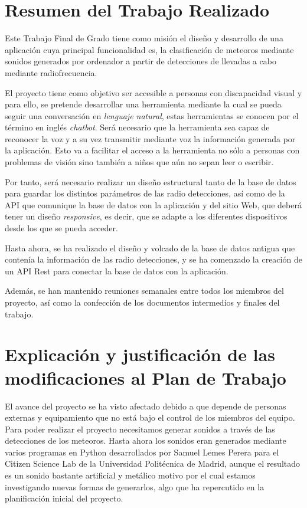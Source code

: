 \chapter{Resumen del Trabajo Realizado}
Este Trabajo Final de Grado tiene como misión el diseño y desarrollo de una aplicación cuya principal funcionalidad es, la clasificación de  meteoros mediante sonidos generados por ordenador a partir de detecciones de llevadas a cabo mediante radiofrecuencia. 

El proyecto tiene como objetivo ser accesible a personas con discapacidad visual y para ello, se pretende desarrollar una herramienta mediante la cual se pueda seguir una conversación en \textit{lenguaje natural}, estas herramientas se conocen por el término en inglés \textit{chatbot}. Será necesario que la herramienta sea capaz de reconocer la voz y a su vez transmitir mediante voz la información generada por la aplicación.
Esto va a facilitar el acceso a la herramienta no sólo a personas con problemas de visión sino también a niños que aún no sepan leer o escribir.

Por tanto, será necesario realizar un diseño estructural tanto de la base de datos para guardar los distintos parámetros de las radio detecciones, así como de la API que comunique la base de datos con la aplicación y del sitio Web, que deberá tener un diseño \textit{responsive}, es decir, que se adapte a los diferentes dispositivos desde los que se pueda acceder.

Hasta ahora, se ha realizado el diseño y volcado de la base de datos antigua que contenía la información de las radio detecciones, y se ha comenzado la creación de un API Rest para conectar la base de datos con la aplicación.

Además, se han mantenido reuniones semanales entre todos los miembros del proyecto, así como la confección de los documentos intermedios y finales del trabajo.



\chapter{Explicación y justificación de las modificaciones al Plan de Trabajo}

El avance del proyecto se ha visto afectado debido a que depende de personas externas y equipamiento que no está bajo el control de los miembros del equipo.
Para poder realizar el proyecto necesitamos generar sonidos a través de las detecciones de los meteoros.
Hasta ahora los sonidos eran generados mediante varios programas en Python desarrollados por Samuel Lemes Perera para el Citizen Science Lab \cite{Stream Generator} de la Universidad Politécnica de Madrid, aunque el resultado es un sonido bastante artificial y metálico motivo por el cual estamos investigando nuevas formas de generarlos, algo que ha repercutido en la planificación inicial del proyecto.

